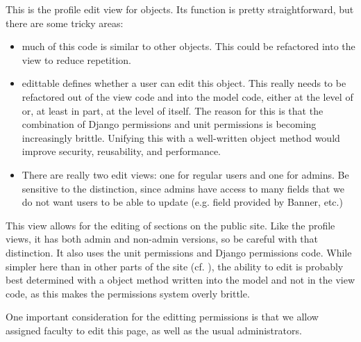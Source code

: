 \documentclass[letterpaper,10pt,english]{sphinxmanual}
\begin{document}

\begin{fulllineitems}
\label{generated/apps.profiles.views:apps.profiles.views.edit_profile}
This is the profile edit view for  objects.  Its function is pretty
straightforward, but there are some tricky areas:
\begin{itemize}
\item {} 
much of this code is similar to other  objects.  This could be
refactored into the  view to reduce repetition.

\item {} 
edittable defines whether a user can edit this object.  This really needs
to be refactored out of the view code and into the model code, either
at the level of  or, at least in part, at the level of
 itself.  The reason for this is that the combination of 
Django permissions and unit permissions is becoming increasingly brittle.
Unifying this with a well-written object method would improve security,
reusability, and performance.

\item {} 
There are really two edit views: one for regular users and one for admins.
Be sensitive to the distinction, since admins have access to many fields
that we do not want users to be able to update (e.g. field provided by
Banner, etc.)

\end{itemize}

\end{fulllineitems}



\begin{fulllineitems}
\label{generated/apps.profiles.views:apps.profiles.views.edit_section_profile}
This view allows for the editing of sections on the public site.
Like the  profile views, it has both admin and non-admin
versions, so be careful with that distinction.  It also uses the 
unit permissions and Django permissions code.  While simpler here than
in other parts of the site (cf. ), the ability to 
edit is probably best determined with a object method written into the 
model and not in the view code, as this makes the permissions system
overly brittle.

One important consideration for the editting permissions is that we
allow assigned faculty to edit this page, as well as the usual 
administrators.

\end{fulllineitems}
\end{document}
